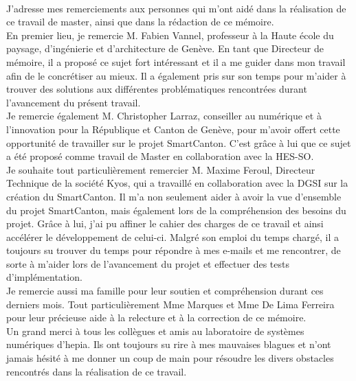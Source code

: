 \documentclass[
11pt, %
twoside, %
french, %
singlespacing, %
nolistspacing, %
headsepline, %
]{MastersDoctoralThesis} %
\begin{document}
\cleardoublepage


\begin{acknowledgements}
~\\

J'adresse mes remerciements aux personnes qui m'ont aidé dans la réalisation de ce travail de master, ainsi que dans la rédaction de ce mémoire.\\

En premier lieu, je remercie M. Fabien Vannel, professeur à la Haute école du paysage, d’ingénierie et d’architecture de Genève. En tant que Directeur de mémoire, il a proposé ce sujet fort intéressant et il a me guider dans mon travail afin de le concrétiser au mieux. Il a également pris sur son temps pour m'aider à trouver des solutions aux différentes problématiques rencontrées durant l'avancement du présent travail.\\

Je remercie également M. Christopher Larraz, conseiller au numérique et à l'innovation pour la République et Canton de Genève, pour m'avoir offert cette opportunité de travailler sur le projet SmartCanton. C'est grâce à lui que ce sujet a été proposé comme travail de Master en collaboration avec la HES-SO.\\

Je souhaite tout particulièrement remercier M. Maxime Feroul, Directeur Technique de la société Kyos, qui a travaillé en collaboration avec la DGSI sur la création du SmartCanton. Il m'a non seulement aider à avoir la vue d'ensemble du projet SmartCanton, mais également lors de la compréhension des besoins du projet. Grâce à lui, j'ai pu affiner le cahier des charges de ce travail et ainsi accélérer le développement de celui-ci. Malgré son emploi du temps chargé, il a toujours su trouver du temps pour répondre à mes e-mails et me rencontrer, de sorte à m'aider lors de l'avancement du projet et effectuer des tests d'implémentation.\\

Je remercie aussi ma famille pour leur soutien et compréhension durant ces derniers mois. Tout particulièrement Mme Marques et Mme De Lima Ferreira pour leur précieuse aide à la relecture et à la correction de ce mémoire.\\

Un grand merci à tous les collègues et amis au laboratoire de systèmes numériques d'hepia. Ils ont toujours su rire à mes mauvaises blagues et n'ont jamais hésité à me donner un coup de main pour résoudre les divers obstacles rencontrés dans la réalisation de ce travail.
\end{acknowledgements}
\cleardoublepage
\end{document}
